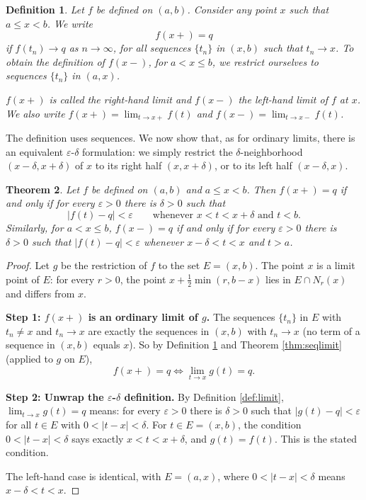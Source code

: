 \documentclass{article}
\theoremstyle{mythm}
\newtheorem{theorem}{Theorem}[section]
\newtheorem{definition}[theorem]{Definition}
\begin{document}
\begin{definition}\label{def:onesided}
Let $f$ be defined on $(a,b)$. Consider any point $x$ such that $a \leq x < b$. We write
\[
f(x+) = q
\]
if $f(t_n) \to q$ as $n \to \infty$, for all sequences $\{t_n\}$ in $(x,b)$ such that $t_n \to x$. To obtain the definition of $f(x-)$, for $a < x \leq b$, we restrict ourselves to sequences $\{t_n\}$ in $(a,x)$.

$f(x+)$ is called the \textit{right-hand limit} and $f(x-)$ the \textit{left-hand limit} of $f$ at $x$. We also write $f(x+) = \lim_{t \to x+} f(t)$ and $f(x-) = \lim_{t \to x-} f(t)$.
\end{definition}

The definition uses sequences. We now show that, as for ordinary limits, there is an equivalent $\varepsilon$-$\delta$ formulation: we simply restrict the $\delta$-neighborhood $(x - \delta, x + \delta)$ of $x$ to its right half $(x, x+\delta)$, or to its left half $(x - \delta, x)$.

\begin{theorem}\label{thm:onesidedeps}
Let $f$ be defined on $(a,b)$ and $a \leq x < b$. Then $f(x+) = q$ if and only if for every $\varepsilon > 0$ there is $\delta > 0$ such that
\[
|f(t) - q| < \varepsilon \qquad \text{whenever } x < t < x + \delta \text{ and } t < b.
\]
Similarly, for $a < x \leq b$, $f(x-) = q$ if and only if for every $\varepsilon > 0$ there is $\delta > 0$ such that $|f(t) - q| < \varepsilon$ whenever $x - \delta < t < x$ and $t > a$.
\end{theorem}

\begin{proof}
Let $g$ be the restriction of $f$ to the set $E = (x,b)$. The point $x$ is a limit point of $E$: for every $r > 0$, the point $x + \frac{1}{2}\min(r, b - x)$ lies in $E \cap N_r(x)$ and differs from $x$.

\textbf{Step 1: $f(x+)$ is an ordinary limit of $g$.} The sequences $\{t_n\}$ in $E$ with $t_n \neq x$ and $t_n \to x$ are exactly the sequences in $(x,b)$ with $t_n \to x$ (no term of a sequence in $(x,b)$ equals $x$). So by Definition \ref{def:onesided} and Theorem \ref{thm:seqlimit} (applied to $g$ on $E$),
\[
f(x+) = q \iff \lim_{t \to x} g(t) = q.
\]

\textbf{Step 2: Unwrap the $\varepsilon$-$\delta$ definition.} By Definition \ref{def:limit}, $\lim_{t\to x} g(t) = q$ means: for every $\varepsilon > 0$ there is $\delta > 0$ such that $|g(t) - q| < \varepsilon$ for all $t \in E$ with $0 < |t - x| < \delta$. For $t \in E = (x,b)$, the condition $0 < |t - x| < \delta$ says exactly $x < t < x + \delta$, and $g(t) = f(t)$. This is the stated condition.

The left-hand case is identical, with $E = (a,x)$, where $0 < |t - x| < \delta$ means $x - \delta < t < x$.
\end{proof}
\end{document}
